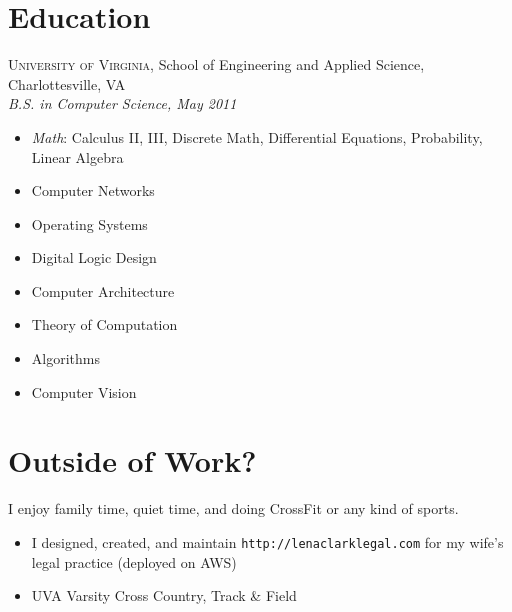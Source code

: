 \documentclass[12pt]{article}
\begin{document}

\section*{Education}

  \textsc{University of Virginia}, School of Engineering and Applied Science,
  Charlottesville, VA \\
  \textit{B.S. in Computer Science, May 2011}

  \begin{multicols}{3}
    \raggedright

    \begin{itemize}
    \item \textit{Math}: Calculus II, III, Discrete Math, Differential
      Equations, Probability, Linear Algebra
    \item Computer Networks
    \item Operating Systems
    \item Digital Logic Design
    \item Computer Architecture
    \item Theory of Computation
    \item Algorithms
    \item Computer Vision
    \end{itemize}
  \end{multicols}



\vskip 4pt
\section*{Outside of Work?}

I enjoy family time, quiet time, and doing CrossFit or any kind of sports.

  \begin{itemize}
    \item I designed, created, and maintain \texttt{http://lenaclarklegal.com}
      for my wife's legal practice (deployed on AWS)
    \item UVA Varsity Cross Country, Track \& Field
  \end{itemize}
\end{document}
